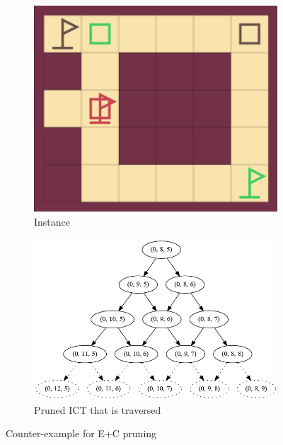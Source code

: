 \documentclass[english,10pt]{article}
\begin{document}
	\begin{figure}[H]
	\centering
	\begin{subfigure}{0.40\textwidth}
		\centering
		\includegraphics[width=\linewidth]{img/counter-example-ep-2}
		\caption{Instance}
		\label{fig:counter-example:a}
	\end{subfigure}
	\begin{subfigure}{0.49\textwidth}
		\centering
		\includegraphics[width=\linewidth]{img/counter-example-tree}
		\caption{Pruned ICT that is traversed}
		\label{fig:counter-example:b}
	\end{subfigure}
	\caption{Counter-example for E+C pruning}
	\label{fig:counter-example}
\end{figure}
\end{document}
